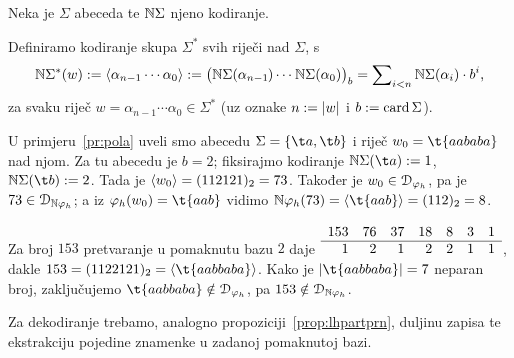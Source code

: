 \begin{definicija}[{name=[kodiranje riječi]}]
Neka je $\Sigma$ abeceda te ${\mathbb N}\Sigma$ njeno kodiranje.

	Definiramo kodiranje skupa $\Sigma^*$ svih riječi nad $\Sigma$, s
\begin{equation}\label{eq:kodNSz}
	{\mathbb N}\Sigma^*(w):=\langle\alpha_{n-1}\dotsm\alpha_0\rangle:=\bigl({\mathbb N}\Sigma(\alpha_{n-1}\mspace{-1mu})\dotsm\mspace{1mu}{\mathbb N}\Sigma(\alpha_0)\bigr)_{b}=\sum\nolimits_{i<n}{\mathbb N}\Sigma(\alpha_i)\cdot b^i\text,
\end{equation}
za svaku riječ $w=\alpha_{n-1}\dotsm\alpha_0\in\Sigma^*$ (uz oznake $n:=\lvert w\rvert$ i $b:=\operatorname{card}\Sigma$).
\end{definicija}

\begin{primjer}[{name=[prateća funkcija jezične funkcije]}]
U primjeru~\ref{pr:pola} uveli smo abecedu $\Sigma=\{\t a,\t b\}$ i riječ $w_0=\t{aababa}$ nad njom. Za tu abecedu je $b=2$; fiksirajmo kodiranje $\N\Sigma(\t a):=1$, $\N\Sigma(\t b):=2$. Tada je $\langle w_0\rangle=(112121)_2=73$.
Također je $w_0\in\mathcal D_{\varphi_h}$, pa je $73\in\mathcal D_{{\mathbb N}\varphi_h}$; a iz $\varphi_h(w_0)=\t{aab}$ vidimo $\N\varphi_h(73)=\kr{\t{aab}}=(112)_2=8$.
	\vspace{-0.9em}

Za broj $153$ pretvaranje u pomaknutu bazu $2$ daje
	$\begin{array}[b]{rrrrrrr}
153 & 76 & 37 & 18 & 8 & 3 & 1\\\hline
1 & 2 & 1 & 2 & 2 & 1 & 1
\end{array}$, dakle $153=(1122121)_2=\kr{\t{aabbaba}}$. Kako je $\dulj{\t{aabbaba}}=7$ neparan broj, zaključujemo $\t{aabbaba}\notin\dom{\varphi_h}$, pa $153\notin\mathcal D_{{\mathbb N}\varphi_h}$.
\end{primjer}

Za dekodiranje trebamo, analogno propoziciji~\ref{prop:lhpartprn}, duljinu zapisa te ekstrakciju pojedine znamenke u zadanoj pomaknutoj bazi. %

